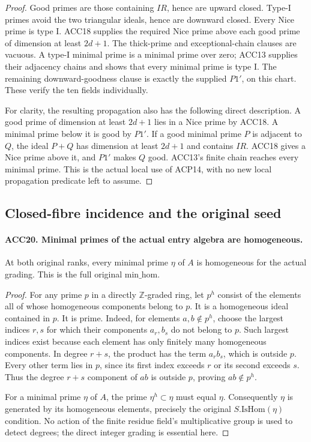 \begin{proof}
Good primes are those containing \(IR\), hence are upward closed.
Type-I primes avoid the two triangular ideals, hence are downward
closed.  Every Nice prime is type I.  ACC18 supplies the required
Nice prime above each good prime of dimension at least \(2d+1\).
The thick-prime and exceptional-chain clauses are vacuous.  A type-I
minimal prime is a minimal prime over zero; ACC13 supplies their
adjacency chains and shows that every minimal prime is type I.
The remaining downward-goodness clause is exactly the supplied
\(P1'\), on this chart.  These verify the ten fields individually.

For clarity, the resulting propagation also has the following
direct description.  A good prime of dimension at least \(2d+1\)
lies in a Nice prime by ACC18.  A minimal prime below it is good
by \(P1'\).  If a good minimal prime \(P\) is adjacent to
\(Q\), the ideal \(P+Q\) has dimension at least \(2d+1\)
and contains \(IR\).  ACC18 gives a Nice prime above it, and
\(P1'\) makes \(Q\) good.  ACC13's finite chain reaches every
minimal prime.  This is the actual local use of ACP14, with no
new local propagation predicate left to assume.
\end{proof}

\subsection{Closed-fibre incidence and the original seed}

\paragraph{ACC20. Minimal primes of the actual entry algebra are homogeneous.}
\label{claim:ACC20}
At both original ranks, every minimal prime \(\eta\) of \(A\)
is homogeneous for the actual grading.  This is the full original
\(\mathrm{min\_hom}\).

\begin{proof}
For any prime \(p\) in a directly \(\mathbb Z\)-graded ring,
let \(p^h\) consist of the elements all of whose homogeneous
components belong to \(p\).  It is a homogeneous ideal contained
in \(p\).  It is prime.  Indeed, for elements \(a,b\notin p^h\),
choose the largest indices \(r,s\) for which their components
\(a_r,b_s\) do not belong to \(p\).  Such largest indices exist
because each element has only finitely many homogeneous components.
In degree \(r+s\), the product has the term \(a_r b_s\),
which is outside \(p\).  Every other term lies in \(p\), since
its first index exceeds \(r\) or its second exceeds \(s\).
Thus the degree \(r+s\) component of \(ab\) is outside \(p\),
proving \(ab\notin p^h\).

For a minimal prime \(\eta\) of \(A\), the prime
\(\eta^h\subset\eta\) must equal \(\eta\).  Consequently
\(\eta\) is generated by its homogeneous elements, precisely
the original \(S.\mathrm{IsHom}(\eta)\) condition.  No action
of the finite residue field's multiplicative group is used to
detect degrees; the direct integer grading is essential here.
\end{proof}

